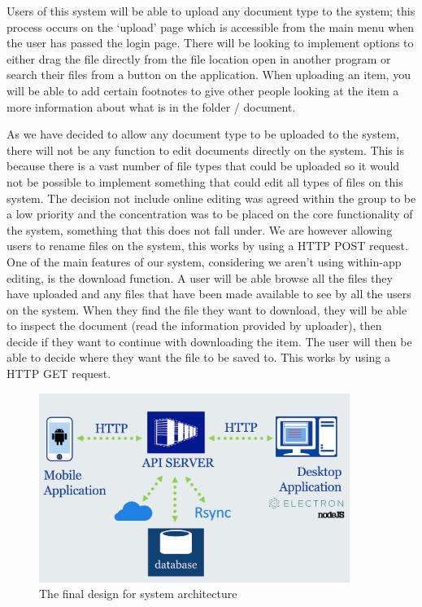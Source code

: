 \documentclass[11pt]{article}
\begin{document}
Users of this system will be able to upload any document type to the system; this process occurs on the ‘upload’ page which is accessible from the main menu when the user has passed the login page. There will be looking to implement options to either drag the file directly from the file location open in another program or search their files from a button on the application. When uploading an item, you will be able to add certain footnotes to give other people looking at the item a more information about what is in the folder / document. 

As we have decided to allow any document type to be uploaded to the system, there will not be any function to edit documents directly on the system. This is because there is a vast number of file types that could be uploaded so it would not be possible to implement something that could edit all types of files on this system. The decision not include online editing was agreed within the group to be a low priority and the concentration was to be placed on the core functionality of the system, something that this does not fall under. We are however allowing users to rename files on the system, this works by using a HTTP POST request.
One of the main features of our system, considering we aren’t using within-app editing, is the download function. A user will be able browse all the files they have uploaded and any files that have been made available to see by all the users on the system. When they find the file they want to download, they will be able to inspect the document (read the information provided by uploader), then decide if they want to continue with downloading the item. The user will then be able to decide where they want the file to be saved to. This works by using a HTTP GET request.


\begin{figure} [H]
\caption{The final design for system architecture}
\centering
\includegraphics[width=0.9\textwidth]{Group_Project/architecture.png}
\end{figure}
\end{document}
